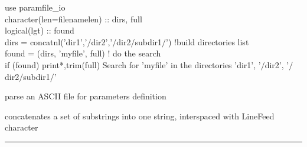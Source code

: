 \begin{example}
{
use paramfile\_io \\
character(len=filenamelen) :: dirs, full \\
logical(lgt) :: found \\
dirs = concatnl('dir1','$/$dir2','$/$dir2$/$subdir1$/$') !build directories list\\
found = \thedocid(dirs, 'myfile', full) ! do the search \\
if (found) print*,trim(full)
}
{{Search for 'myfile' in the directories  'dir1', '$/$dir2', '$/$dir2$/$subdir1$/$'}}
\end{example}

\begin{related}
  \begin{sulist}{} %
  \item[\htmlref{parse\_xxx}{sub:parse_xxx}] parse an ASCII file for parameters definition
  \item[\htmlref{concatnl}{sub:concatnl}] concatenates a set of substrings into one string, interspaced
  with LineFeed character
  \end{sulist}
\end{related}

\rule{\hsize}{2mm}

